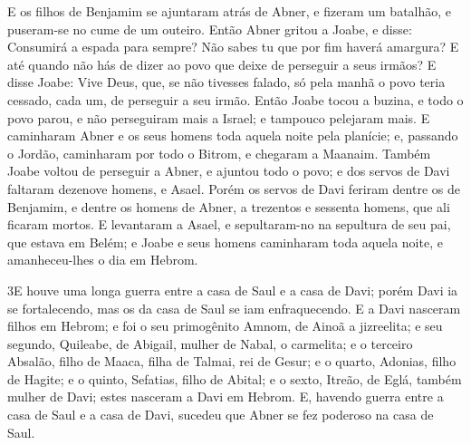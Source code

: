E os filhos de Benjamim se ajuntaram atrás de Abner, e fizeram um
batalhão, e puseram-se no cume de um outeiro. Então Abner
gritou a Joabe, e disse: Consumirá a espada para sempre? Não sabes
tu que por fim haverá amargura? E até quando não hás de dizer ao
povo que deixe de perseguir a seus irmãos? E disse Joabe:
Vive Deus, que, se não tivesses falado, só pela manhã o povo teria
cessado, cada um, de perseguir a seu irmão. Então Joabe tocou
a buzina, e todo o povo parou, e não perseguiram mais a Israel; e
tampouco pelejaram mais. E caminharam Abner e os seus homens
toda aquela noite pela planície; e, passando o Jordão, caminharam
por todo o Bitrom, e chegaram a Maanaim. Também Joabe voltou
de perseguir a Abner, e ajuntou todo o povo; e dos servos de Davi
faltaram dezenove homens, e Asael. Porém os servos de Davi
feriram dentre os de Benjamim, e dentre os homens de Abner, a
trezentos e sessenta homens, que ali ficaram mortos. E
levantaram a Asael, e sepultaram-no na sepultura de seu pai, que
estava em Belém; e Joabe e seus homens caminharam toda aquela noite,
e amanheceu-lhes o dia em Hebrom.

\medskip

\lettrine{3} E houve uma longa guerra entre a casa de Saul e a
casa de Davi; porém Davi ia se fortalecendo, mas os da casa de Saul
se iam enfraquecendo. E a Davi nasceram filhos em Hebrom; e foi
o seu primogênito Amnom, de Ainoã a jizreelita; e seu segundo,
Quileabe, de Abigail, mulher de Nabal, o carmelita; e o terceiro
Absalão, filho de Maaca, filha de Talmai, rei de Gesur; e o
quarto, Adonias, filho de Hagite; e o quinto, Sefatias, filho de
Abital; e o sexto, Itreão, de Eglá, também mulher de Davi; estes
nasceram a Davi em Hebrom. E, havendo guerra entre a casa de
Saul e a casa de Davi, sucedeu que Abner se fez poderoso na casa de
Saul.

